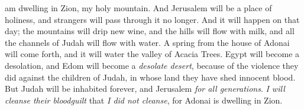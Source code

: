 \begin{biblechapter}
am dwelling in Zion, my holy mountain. 
And Jerusalem will be a place of holiness, 
and strangers will pass through it no longer.
\verse And it will happen on that day; 
the mountains will drip new wine, 
and the hills will flow with milk, 
and all the channels of Judah will flow with water. 
A spring from the house of Adonai will come forth, 
and it will water the valley of Acacia Trees.
\verse Egypt will become a desolation, 
and Edom will become a \textit{desolate desert}, 
because of the violence they did against the children of Judah, 
in whose land they have shed innocent blood.
\verse But Judah will be inhabited forever, 
and Jerusalem \textit{for all generations}.
\verse \textit{I will cleanse their bloodguilt} that \textit{I did not cleanse}, 
for Adonai is dwelling in Zion.
\end{biblechapter}

